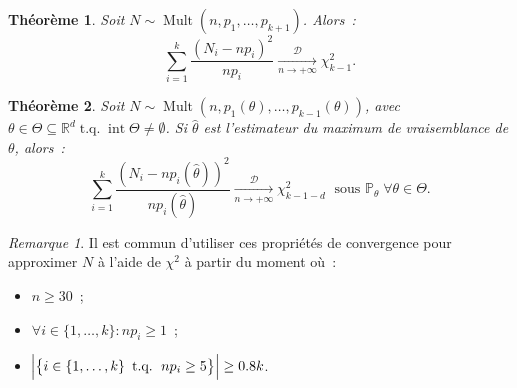 \documentclass{report}
\DeclareMathOperator{\tq}{\text{ t.q. }}
\DeclareMathOperator{\Mult}{Mult}
\DeclareMathOperator{\intr}{int}  %
\renewcommand{\P}{\mathbb P}
\newcommand{\pinfty}{{+\infty}}
\newcommand{\cvgd}{\xrightarrow[n \to \pinfty]{\mathcal D}}
\newcommand{\R}{\mathbb R}
\newtheorem{thm}{Théorème}[chapter]
\theoremstyle{definition}
\theoremstyle{remark}
\newtheorem*{rmq}{Remarque}
\begin{document}
			\begin{thm} Soit $N \sim \Mult(n, p_1, \ldots, p_{k+1})$. Alors~:
			\[\sum_{i=1}^k\frac {(N_i - np_i)^2}{np_i} \cvgd \chi_{k-1}^2.\]
			\end{thm}

			\begin{thm} Soit $N \sim \Mult(n, p_1(\theta), \ldots, p_{k-1}(\theta))$, avec $\theta \in \Theta \subseteq \R^d \tq \intr \Theta \neq \emptyset$.
			Si $\hat \theta$ est l'estimateur du maximum de vraisemblance de $\theta$, alors~:
			\[\sum_{i=1}^k\frac {(N_i - np_i(\hat \theta))^2}{np_i(\hat \theta)} \cvgd \chi^2_{k-1-d}\;\text{ sous } \P_\theta \; \forall \theta \in \Theta.\]
			\end{thm}

			\begin{rmq} Il est commun d'utiliser ces propriétés de convergence pour approximer $N$ à l'aide de $\chi^2$ à partir du moment où~:
			\begin{itemize}
				\item $n \geq 30$~;
				\item $\forall i \in \{1, \ldots, k\} : np_i \geq 1$~;
				\item $\abs {\left\{i \in \{1, \ldots, k\} \tq np_i \geq 5\right\}} \geq 0.8k$.
			\end{itemize}
			\end{rmq}
\end{document}
